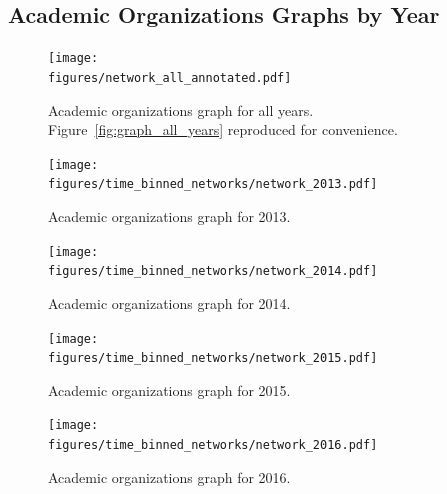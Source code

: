 \documentclass[notitlepage,aps,prd,nofootinbib]{revtex4-1}
\newcommand{\figures}{../outputs/plots}
\newcommand{\includedir}{../latex_files}
\begin{document}




\newpage %

\begin{appendices}


\section{Academic Organizations Graphs by Year}
\label{appendix:graphs_by_year}

\begin{figure}[!htb]\centering
  \texttt{[image: \\figures/network\_all\_annotated.pdf]}
  \caption{Academic organizations graph for all years. Figure~\ref{fig:graph_all_years} reproduced for convenience.}
\end{figure}

\vspace{-0.5cm}

\begin{figure}[!htb]\centering
  \texttt{[image: \\figures/time\_binned\_networks/network\_2013.pdf]}
  \caption{Academic organizations graph for 2013.}
\end{figure}

\begin{figure}[!htb]\centering
  \texttt{[image: \\figures/time\_binned\_networks/network\_2014.pdf]}
  \caption{Academic organizations graph for 2014.}
\end{figure}

\begin{figure}[!htb]\centering
  \texttt{[image: \\figures/time\_binned\_networks/network\_2015.pdf]}
  \caption{Academic organizations graph for 2015.}
\end{figure}

\begin{figure}[!htb]\centering
  \texttt{[image: \\figures/time\_binned\_networks/network\_2016.pdf]}
  \caption{Academic organizations graph for 2016.}
\end{figure}


\end{appendices}
\end{document}
